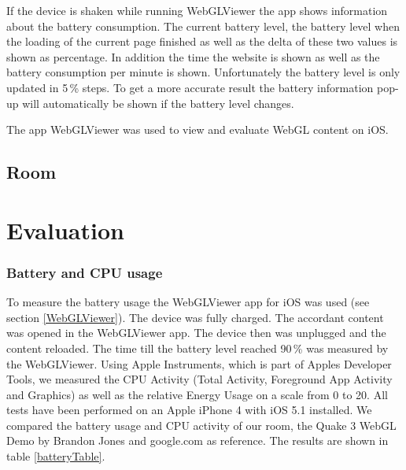 \documentclass[12pt,journal,compsoc]{IEEEtran}
\begin{document}
	If the device is shaken while running WebGLViewer the app shows information about the battery consumption. The current battery level, the battery level when the loading of the current page finished as well as the delta of these two values is shown as percentage. In addition the time the website is shown as well as the battery consumption per minute is shown. Unfortunately the battery level is only updated in 5\,\% steps. To get a more accurate result the battery information pop-up will automatically be shown if the battery level changes.
	
	The app WebGLViewer was used to view and evaluate WebGL content on iOS. 

\subsection{Room}

\section{Evaluation}

\subsubsection{Battery and CPU usage}
To measure the battery usage the WebGLViewer app for iOS was used (see section \ref{WebGLViewer}). The device was fully charged. The accordant content was opened in the WebGLViewer app. The device then was unplugged and the content reloaded. The time till the battery level reached 90\,\% was measured by the WebGLViewer. Using Apple Instruments, which is part of Apples Developer Tools, we measured the CPU Activity (Total Activity, Foreground App Activity and Graphics) as well as the relative Energy Usage on a scale from 0 to 20. All tests have been performed on an Apple iPhone 4 with iOS 5.1 installed. We compared the battery usage and CPU activity of our room, the Quake 3 WebGL Demo by Brandon Jones \cite{quakewebgl} and google.com as reference. The results are shown in table \ref{batteryTable}. 
\end{document}

